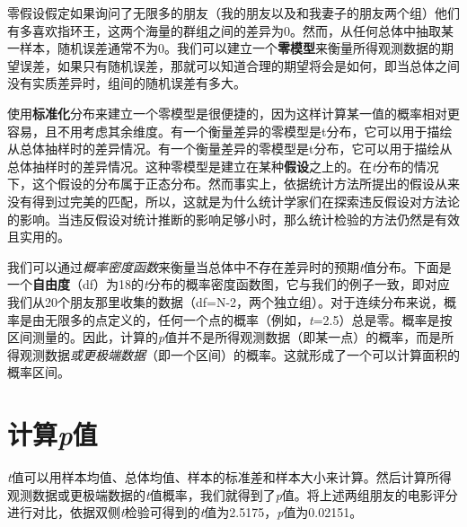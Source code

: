 \documentclass[
  letterpaper,
  DIV=11,
  numbers=noendperiod]{scrreprt}
\newenvironment{Shaded}{\begin{snugshade}}{\end{snugshade}}
\newcommand{\AttributeTok}[1]{\textcolor[rgb]{0.40,0.45,0.13}{#1}}
\newcommand{\ConstantTok}[1]{\textcolor[rgb]{0.56,0.35,0.01}{#1}}
\newcommand{\FunctionTok}[1]{\textcolor[rgb]{0.28,0.35,0.67}{#1}}
\newcommand{\NormalTok}[1]{\textcolor[rgb]{0.00,0.23,0.31}{#1}}
\newcommand{\SpecialCharTok}[1]{\textcolor[rgb]{0.37,0.37,0.37}{#1}}
\newcommand{\StringTok}[1]{\textcolor[rgb]{0.13,0.47,0.30}{#1}}
\begin{document}
零假设假定如果询问了无限多的朋友（我的朋友以及和我妻子的朋友两个组）他们有多喜欢指环王，这两个海量的群组之间的差异为0。然而，从任何总体中抽取某一样本，随机误差通常不为0。我们可以建立一个\textbf{零模型}来衡量所得观测数据的期望误差，如果只有随机误差，那就可以知道合理的期望将会是如何，即当总体之间没有实质差异时，组间的随机误差有多大。

使用\textbf{标准化}分布来建立一个零模型是很便捷的，因为这样计算某一值的概率相对更容易，且不用考虑其余维度。有一个衡量差异的零模型是t分布，它可以用于描绘从总体抽样时的差异情况。有一个衡量差异的零模型是t分布，它可以用于描绘从总体抽样时的差异情况。这种零模型是建立在某种\textbf{假设}之上的。在\emph{t}分布的情况下，这个假设的分布属于正态分布。然而事实上，依据统计方法所提出的假设从来没有得到过完美的匹配，所以，这就是为什么统计学家们在探索违反假设对方法论的影响。当违反假设对统计推断的影响足够小时，那么统计检验的方法仍然是有效且实用的。

我们可以通过\emph{概率密度函数}来衡量当总体中不存在差异时的预期\emph{t}值分布。下面是一个\textbf{自由度}（df）为18的\emph{t}分布的概率密度函数图，它与我们的例子一致，即对应我们从20个朋友那里收集的数据（df=N-2，两个独立组）。对于连续分布来说，概率是由无限多的点定义的，任何一个点的概率（例如，\emph{t}=2.5）总是零。概率是按区间测量的。因此，计算的\emph{p}值并不是所得观测数据（即某一点）的概率，而是所得观测数据\emph{或更极端数据}（即一个区间）的概率。这就形成了一个可以计算面积的概率区间。

\hypertarget{ux8ba1ux7b97pux503c}{%
\section{\texorpdfstring{计算\emph{p}值}{计算p值}}\label{ux8ba1ux7b97pux503c}}

\emph{t}值可以用样本均值、总体均值、样本的标准差和样本大小来计算。然后计算所得观测数据或更极端数据的\emph{t}值概率，我们就得到了\emph{p}值。将上述两组朋友的电影评分进行对比，依据双侧\emph{t}检验可得到的\emph{t}值为2.5175，\emph{p}值为0.02151。

\begin{Shaded}
\end{Shaded}
\end{document}
